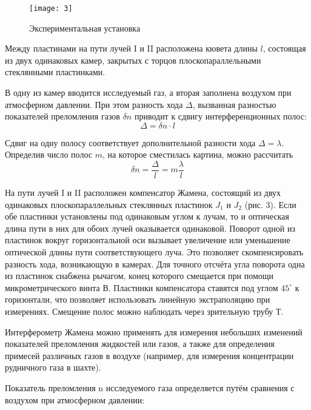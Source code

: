 \documentclass[a4paper, 12pt]{article}
\begin{document}
\begin{wrapfigure}{r}{0.5\linewidth}
    \vspace{-20pt}
    \texttt{[image: 3]}
    \captionsetup{justification=centering}
    \caption{Экспериментальная установка}
\end{wrapfigure}

Между пластинами на пути лучей I и II расположена кювета длины $l$,
состоящая из двух одинаковых камер, закрытых с торцов
плоскопараллельными стеклянными пластинками.

В одну из камер вводится исследуемый газ, а вторая заполнена воздухом
при атмосферном давлении. При этом разность хода $\Delta$, вызванная
разностью показателей преломления газов $\delta n$ приводит к сдвигу
интерференционных полос:
\begin{equation}
    \Delta = \delta n \cdot l
\end{equation}

Сдвиг на одну полосу соответствует дополнительной разности хода
$\Delta = \lambda$.
Определив число полос $m$, на которое сместилась картина, можно
рассчитать
\begin{equation}
    \delta n = \frac{\Delta}{l} = m \frac{\lambda}{l}
\end{equation}

На пути лучей I и II расположен компенсатор Жамена, состоящий из двух
одинаковых плоскопараллельных стеклянных пластинок $J_1$ и $J_2$ (рис.
3).
Если обе пластинки установлены под одинаковым углом к лучам, то и
оптическая длина пути в них для обоих лучей оказывается одинаковой.
Поворот одной из пластинок вокруг горизонтальной оси вызывает
увеличение или уменьшение оптической длины пути соответствующего луча.
Это позволяет скомпенсировать разность хода, возникающую в камерах.
Для точного отсчёта угла поворота одна из пластинок снабжена рычагом,
конец которого смещается при помощи микрометрического винта В.
Пластинки компенсатора ставятся под углом $45^\circ$ к горизонтали, что
позволяет использовать линейную экстраполяцию при измерениях. Смещение
полос можно наблюдать через зрительную трубу Т.

Интерферометр Жамена можно применять для измерения небольших изменений
показателей преломления жидкостей или газов, а также для определения
примесей различных газов в воздухе (например, для измерения
концентрации рудничного газа в шахте).

Показатель преломления n исследуемого газа определяется путём
сравнения с воздухом при атмосферном давлении:
\end{document}

